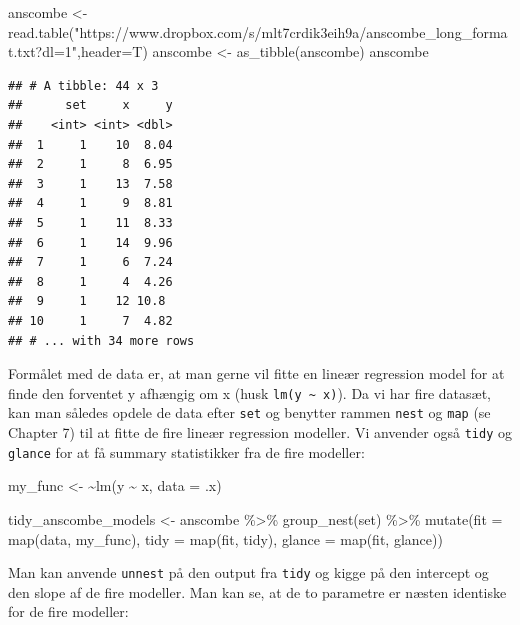 \documentclass[
]{book}
\newenvironment{Shaded}{\begin{snugshade}}{\end{snugshade}}
\newcommand{\AttributeTok}[1]{\textcolor[rgb]{0.77,0.63,0.00}{#1}}
\newcommand{\ErrorTok}[1]{\textcolor[rgb]{0.64,0.00,0.00}{\textbf{#1}}}
\newcommand{\FunctionTok}[1]{\textcolor[rgb]{0.00,0.00,0.00}{#1}}
\newcommand{\NormalTok}[1]{#1}
\newcommand{\OtherTok}[1]{\textcolor[rgb]{0.56,0.35,0.01}{#1}}
\newcommand{\SpecialCharTok}[1]{\textcolor[rgb]{0.00,0.00,0.00}{#1}}
\newcommand{\StringTok}[1]{\textcolor[rgb]{0.31,0.60,0.02}{#1}}
\begin{document}
\begin{Shaded}
\begin{Highlighting}[]
\NormalTok{anscombe }\OtherTok{\textless{}{-}} \FunctionTok{read.table}\NormalTok{(}\StringTok{"https://www.dropbox.com/s/mlt7crdik3eih9a/anscombe\_long\_format.txt?dl=1"}\NormalTok{,}\AttributeTok{header=}\NormalTok{T)}
\NormalTok{anscombe }\OtherTok{\textless{}{-}} \FunctionTok{as\_tibble}\NormalTok{(anscombe)}
\NormalTok{anscombe}
\end{Highlighting}
\end{Shaded}

\begin{verbatim}
## # A tibble: 44 x 3
##      set     x     y
##    <int> <int> <dbl>
##  1     1    10  8.04
##  2     1     8  6.95
##  3     1    13  7.58
##  4     1     9  8.81
##  5     1    11  8.33
##  6     1    14  9.96
##  7     1     6  7.24
##  8     1     4  4.26
##  9     1    12 10.8 
## 10     1     7  4.82
## # ... with 34 more rows
\end{verbatim}

Formålet med de data er, at man gerne vil fitte en lineær regression model for at finde den forventet y afhængig om x (husk \texttt{lm(y\ \textasciitilde{}\ x)}). Da vi har fire datasæt, kan man således opdele de data efter \texttt{set} og benytter rammen \texttt{nest} og \texttt{map} (se Chapter 7) til at fitte de fire lineær regression modeller. Vi anvender også \texttt{tidy} og \texttt{glance} for at få summary statistikker fra de fire modeller:

\begin{Shaded}
\begin{Highlighting}[]
\NormalTok{my\_func }\OtherTok{\textless{}{-}} \ErrorTok{\textasciitilde{}}\FunctionTok{lm}\NormalTok{(y }\SpecialCharTok{\textasciitilde{}}\NormalTok{ x, }\AttributeTok{data =}\NormalTok{ .x)}

\NormalTok{tidy\_anscombe\_models }\OtherTok{\textless{}{-}}\NormalTok{ anscombe }\SpecialCharTok{\%\textgreater{}\%} 
  \FunctionTok{group\_nest}\NormalTok{(set) }\SpecialCharTok{\%\textgreater{}\%} 
  \FunctionTok{mutate}\NormalTok{(}\AttributeTok{fit =} \FunctionTok{map}\NormalTok{(data, my\_func),}
         \AttributeTok{tidy =} \FunctionTok{map}\NormalTok{(fit, tidy),}
         \AttributeTok{glance =} \FunctionTok{map}\NormalTok{(fit, glance))}
\end{Highlighting}
\end{Shaded}

Man kan anvende \texttt{unnest} på den output fra \texttt{tidy} og kigge på den intercept og den slope af de fire modeller. Man kan se, at de to parametre er næsten identiske for de fire modeller:
\end{document}
